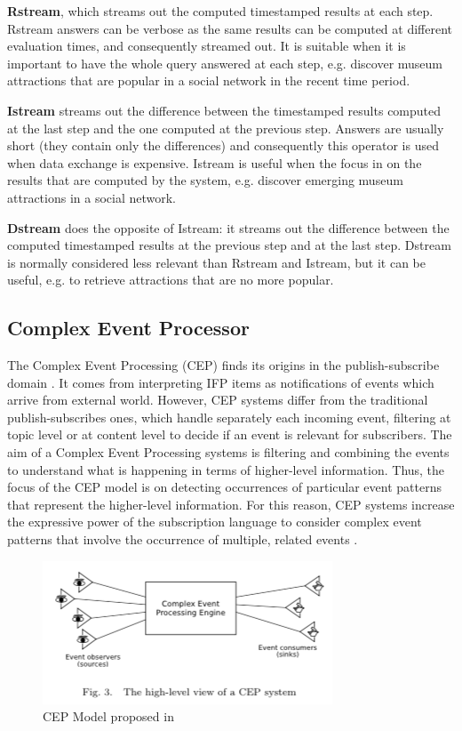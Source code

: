 \textbf{Rstream}, which streams out the computed timestamped results at each step. Rstream answers can be verbose as the same results can be computed at different evaluation times, and consequently streamed out. It is suitable when it is important to have the whole query answered at each step, e.g. discover museum attractions that are popular in a social network in the recent time period.

\textbf{Istream} streams out the difference between the timestamped results computed at the last step and the one computed at the previous step. Answers are usually short (they contain only the differences) and consequently this operator is used when data exchange is expensive. Istream is useful when the focus in on the results that are computed by the system, e.g. discover emerging museum attractions in a social network.

\textbf{Dstream} does the opposite of Istream: it streams out the difference between the computed timestamped results at the previous step and at the last step. Dstream is normally considered less relevant than Rstream and Istream, but it can be useful, e.g. to retrieve attractions that are no more popular.


\subsection{Complex Event Processor}\label{sec:cep}

The Complex Event Processing (CEP)  finds its origins in the publish-subscribe domain \cite{Eugster:2003:MFP:857076.857078}. It comes from interpreting IFP items as notifications of events which arrive from  external world.  However, CEP systems differ from the traditional publish-subscribes ones, which handle separately each incoming event, filtering at topic level or at content level to decide if an event is relevant for subscribers. The aim of a Complex Event Processing systems is filtering and combining the events to understand what is happening in terms of higher-level information. Thus, the focus of the CEP model is on detecting occurrences of particular event patterns that represent the higher-level information. For this reason, CEP systems increase the expressive power of the subscription language to consider complex event patterns that involve the occurrence of multiple, related events \cite{Cugola:2012:PFI:2187671.2187677}.

\begin{figure}[tbh]
  \centering
	\includegraphics[width=0.75\linewidth]{images/cep}
	\caption{CEP Model proposed in \cite{Cugola:2012:PFI:2187671.2187677}  } 
  	\label{fig:cep}
\end{figure}

